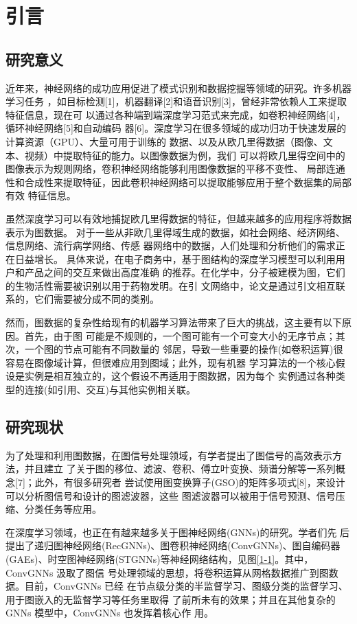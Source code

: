 \cleardoublepage

\section{引言}

\subsection{研究意义}
近年来，神经网络的成功应用促进了模式识别和数据挖掘等领域的研究。许多机器学习任务
，如目标检测[1]，机器翻译[2]和语音识别[3]，曾经非常依赖人工来提取特征信息，现在可
以通过各种端到端深度学习范式来完成，如卷积神经网络[4]，循环神经网络[5]和自动编码
器[6]。深度学习在很多领域的成功归功于快速发展的计算资源（GPU）、大量可用于训练的
数据、以及从欧几里得数据（图像、文本、视频）中提取特征的能力。以图像数据为例，我们
可以将欧几里得空间中的图像表示为规则网络，卷积神经网络能够利用图像数据的平移不变性、
局部连通性和合成性来提取特征，因此卷积神经网络可以提取能够应用于整个数据集的局部有效
特征信息。

虽然深度学习可以有效地捕捉欧几里得数据的特征，但越来越多的应用程序将数据表示为图数据。
对于一些从非欧几里得域生成的数据，如社会网络、经济网络、信息网络、流行病学网络、传感
器网络中的数据，人们处理和分析他们的需求正在日益增长。
具体来说，在电子商务中，基于图结构的深度学习模型可以利用用户和产品之间的交互来做出高度准确
的推荐。在化学中，分子被建模为图，它们的生物活性需要被识别以用于药物发明。在引
文网络中，论文是通过引文相互联系的，它们需要被分成不同的类别。

然而，图数据的复杂性给现有的机器学习算法带来了巨大的挑战，这主要有以下原因。首先，由于图
可能是不规则的，一个图可能有一个可变大小的无序节点；其次，一个图的节点可能有不同数量的
邻居，导致一些重要的操作(如卷积运算)很容易在图像域计算，但很难应用到图域；此外，现有机器
学习算法的一个核心假设是实例是相互独立的，这个假设不再适用于图数据，因为每个
实例通过各种类型的连接(如引用、交互)与其他实例相关联。

\subsection{研究现状}
为了处理和利用图数据，在图信号处理领域，有学者提出了图信号的高效表示方法，并且建立
了关于图的移位、滤波、卷积、傅立叶变换、频谱分解等一系列概念[7]；此外，有很多研究者
尝试使用图变换算子(GSO)的矩阵多项式[8]，来设计可以分析图信号和设计的图滤波器，这些
图滤波器可以被用于信号预测、信号压缩、分类任务等应用。

在深度学习领域，也正在有越来越多关于图神经网络(GNNs)的研究。学者们先
后提出了递归图神经网络(RecGNNs)、图卷积神经网络(ConvGNNs)、图自编码器
(GAEs)、时空图神经网络(STGNNs)等神经网络结构，见图\ref{1-1}。其中，ConvGNNs 汲取了图信
号处理领域的思想，将卷积运算从网格数据推广到图数据。目前，ConvGNNs 已经
在节点级分类的半监督学习、图级分类的监督学习、用于图嵌入的无监督学习等任务里取得
了前所未有的效果；并且在其他复杂的GNNs 模型中，ConvGNNs 也发挥着核心作
用。

